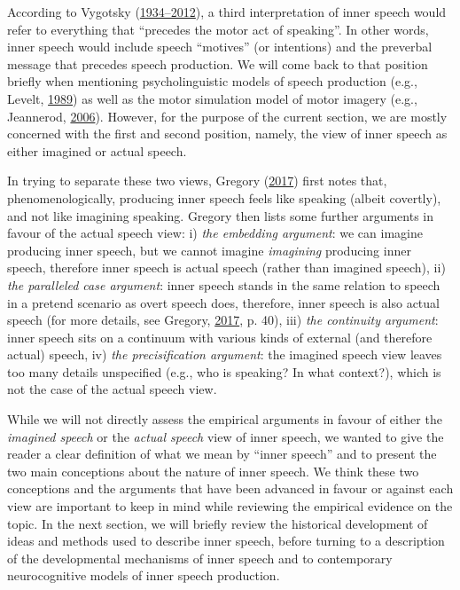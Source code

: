 \documentclass[a4paper,12pt,twoside,onecolumn,openright,final,oldfontcommands]{memoir}
\begin{document}
According to Vygotsky (\protect\hyperlink{ref-vygotsky_thought_1934}{1934--2012}), a third interpretation of inner speech would refer to everything that \enquote{precedes the motor act of speaking}. In other words, inner speech would include speech \enquote{motives} (or intentions) and the preverbal message that precedes speech production. We will come back to that position briefly when mentioning psycholinguistic models of speech production (e.g., Levelt, \protect\hyperlink{ref-levelt_speaking_1989}{1989}) as well as the motor simulation model of motor imagery (e.g., Jeannerod, \protect\hyperlink{ref-jeannerod_motor_2006}{2006}). However, for the purpose of the current section, we are mostly concerned with the first and second position, namely, the view of inner speech as either imagined or actual speech.

In trying to separate these two views, Gregory (\protect\hyperlink{ref-gregory_inner_2017}{2017}) first notes that, phenomenologically, producing inner speech feels like speaking (albeit covertly), and not like imagining speaking. Gregory then lists some further arguments in favour of the actual speech view: i) \emph{the embedding argument}: we can imagine producing inner speech, but we cannot imagine \emph{imagining} producing inner speech, therefore inner speech is actual speech (rather than imagined speech), ii) \emph{the paralleled case argument}: inner speech stands in the same relation to speech in a pretend scenario as overt speech does, therefore, inner speech is also actual speech (for more details, see Gregory, \protect\hyperlink{ref-gregory_inner_2017}{2017}, p. 40), iii) \emph{the continuity argument}: inner speech sits on a continuum with various kinds of external (and therefore actual) speech, iv) \emph{the precisification argument}: the imagined speech view leaves too many details unspecified (e.g., who is speaking? In what context?), which is not the case of the actual speech view.

While we will not directly assess the empirical arguments in favour of either the \emph{imagined speech} or the \emph{actual speech} view of inner speech, we wanted to give the reader a clear definition of what we mean by \enquote{inner speech} and to present the two main conceptions about the nature of inner speech. We think these two conceptions and the arguments that have been advanced in favour or against each view are important to keep in mind while reviewing the empirical evidence on the topic. In the next section, we will briefly review the historical development of ideas and methods used to describe inner speech, before turning to a description of the developmental mechanisms of inner speech and to contemporary neurocognitive models of inner speech production.
\end{document}

